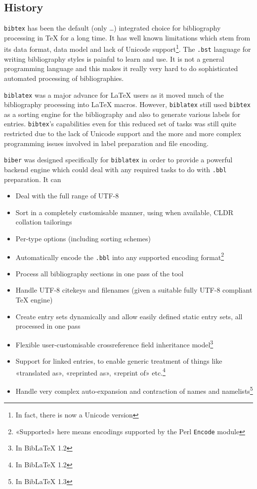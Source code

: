\documentclass{ltxdockit}
\begin{document}
\subsection{History}

\verb+bibtex+ has been the default (only \ldots) integrated choice for
bibliography processing in TeX for a long time. It has well known
limitations which stem from its data format, data model and lack of Unicode
support\footnote{In fact, there is now a Unicode version}. The
\verb+.bst+ language for writing bibliography styles is painful to learn
and use. It is not a general programming language and this makes it really
very hard to do sophisticated automated processing of bibliographies.

\verb+biblatex+ was a major advance for LaTeX users as it moved much
of the bibliography processing into LaTeX macros. However,
\verb+biblatex+ still used \verb+bibtex+ as a sorting engine for the
bibliography and also to generate various labels for
entries. \verb+bibtex+'s capabilities even for this reduced set of
tasks was still quite restricted due to the lack of Unicode support and
the more and more complex programming issues involved in label
preparation and file encoding.

\verb+biber+ was designed specifically for \verb+biblatex+ in order to
provide a powerful backend engine which could deal with any required
tasks to do with \verb+.bbl+ preparation. It can

\begin{itemize}
\item Deal with the full range of UTF-8
\item Sort in a completely customisable manner, using when available,
  CLDR collation tailorings
\item Per-type options (including sorting schemes)
\item Automatically encode the \verb+.bbl+ into any supported encoding
  format\footnote{«Supported» here means encodings supported by the
    Perl \texttt{Encode} module}
\item Process all bibliography sections in one pass of the tool
\item Handle UTF-8 citekeys and filenames (given a suitable fully
  UTF-8 compliant TeX engine)
\item Create entry sets dynamically and allow easily defined static entry sets,
  all processed in one pass
\item Flexible user-customisable crossreference field inheritance
  model\footnote{In BibLaTeX 1.2}
\item Support for linked entries, to enable generic treatment of things
  like «translated as», «reprinted as», «reprint of» etc.\footnote{In BibLaTeX 1.2}
\item Handle very complex auto-expansion and contraction of names and
  namelists\footnote{In BibLaTeX 1.3}
\end{itemize}
\end{document}
